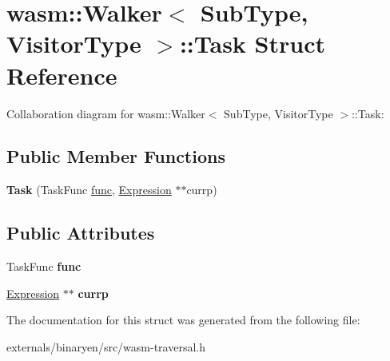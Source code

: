 \hypertarget{structwasm_1_1_walker_1_1_task}{}\section{wasm\+:\+:Walker$<$ Sub\+Type, Visitor\+Type $>$\+:\+:Task Struct Reference}
\label{structwasm_1_1_walker_1_1_task}


Collaboration diagram for wasm\+:\+:Walker$<$ Sub\+Type, Visitor\+Type $>$\+:\+:Task\+:
\subsection*{Public Member Functions}
\begin{DoxyCompactItemize}
\item 
\mbox{\label{structwasm_1_1_walker_1_1_task_a971b10bcf02ebdedd3f2b78f98743158}} 
{\bfseries Task} (Task\+Func \mbox{\hyperlink{structfunc}{func}}, \mbox{\hyperlink{classwasm_1_1_expression}{Expression}} $\ast$$\ast$currp)
\end{DoxyCompactItemize}
\subsection*{Public Attributes}
\begin{DoxyCompactItemize}
\item 
\mbox{\label{structwasm_1_1_walker_1_1_task_aeac30a4267ed11a400038de86a3a85cd}} 
Task\+Func {\bfseries func}
\item 
\mbox{\label{structwasm_1_1_walker_1_1_task_a632e03244045083883b5bee73177d4d1}} 
\mbox{\hyperlink{classwasm_1_1_expression}{Expression}} $\ast$$\ast$ {\bfseries currp}
\end{DoxyCompactItemize}


The documentation for this struct was generated from the following file\+:\begin{DoxyCompactItemize}
\item 
externals/binaryen/src/wasm-\/traversal.\+h\end{DoxyCompactItemize}
